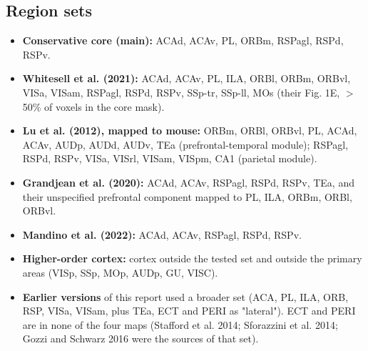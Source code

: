 \documentclass[10pt,a4paper]{article}
\begin{document}
\subsection{Region sets}
\begin{itemize}
\item \textbf{Conservative core (main):} ACAd, ACAv, PL, ORBm, RSPagl, RSPd, RSPv.
\item \textbf{Whitesell et al. (2021):} ACAd, ACAv, PL, ILA, ORBl, ORBm, ORBvl, VISa, VISam, RSPagl, RSPd, RSPv, SSp-tr, SSp-ll, MOs (their Fig. 1E, $>$50\% of voxels in the core mask).
\item \textbf{Lu et al. (2012), mapped to mouse:} ORBm, ORBl, ORBvl, PL, ACAd, ACAv, AUDp, AUDd, AUDv, TEa (prefrontal-temporal module); RSPagl, RSPd, RSPv, VISa, VISrl, VISam, VISpm, CA1 (parietal module).
\item \textbf{Grandjean et al. (2020):} ACAd, ACAv, RSPagl, RSPd, RSPv, TEa, and their unspecified prefrontal component mapped to PL, ILA, ORBm, ORBl, ORBvl.
\item \textbf{Mandino et al. (2022):} ACAd, ACAv, RSPagl, RSPd, RSPv.
\item \textbf{Higher-order cortex:} cortex outside the tested set and outside the primary areas (VISp, SSp, MOp, AUDp, GU, VISC).
\item \textbf{Earlier versions} of this report used a broader set (ACA, PL, ILA, ORB, RSP, VISa, VISam, plus TEa, ECT and PERI as "lateral"). ECT and PERI are in none of the four maps (Stafford et al. 2014; Sforazzini et al. 2014; Gozzi and Schwarz 2016 were the sources of that set).
\end{itemize}
\end{document}
